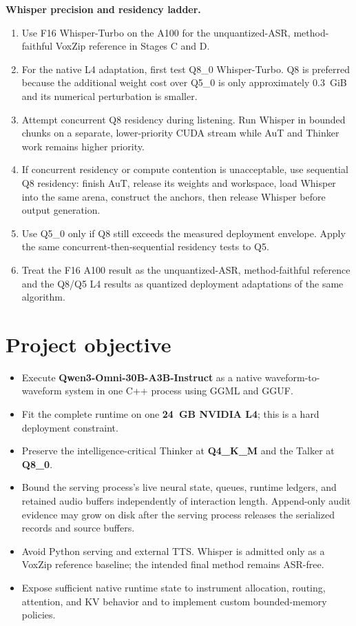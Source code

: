 \documentclass[10pt,letterpaper]{article}
\begin{document}
\noindent\textbf{Whisper precision and residency ladder.}
\begin{enumerate}
    \item Use F16 Whisper-Turbo on the A100 for the unquantized-ASR, method-faithful VoxZip reference in Stages C and D.
    \item For the native L4 adaptation, first test Q8\_0 Whisper-Turbo. Q8 is preferred because the additional weight cost over Q5\_0 is only approximately 0.3~GiB and its numerical perturbation is smaller.
    \item Attempt concurrent Q8 residency during listening. Run Whisper in bounded chunks on a separate, lower-priority CUDA stream while AuT and Thinker work remains higher priority.
    \item If concurrent residency or compute contention is unacceptable, use sequential Q8 residency: finish AuT, release its weights and workspace, load Whisper into the same arena, construct the anchors, then release Whisper before output generation.
    \item Use Q5\_0 only if Q8 still exceeds the measured deployment envelope. Apply the same concurrent-then-sequential residency tests to Q5.
    \item Treat the F16 A100 result as the unquantized-ASR, method-faithful reference and the Q8/Q5 L4 results as quantized deployment adaptations of the same algorithm.
\end{enumerate}

\section*{Project objective}
\begin{itemize}
    \item Execute \textbf{Qwen3-Omni-30B-A3B-Instruct} as a native waveform-to-waveform system in one C++ process using GGML and GGUF.
    \item Fit the complete runtime on one \textbf{24~GB NVIDIA L4}; this is a hard deployment constraint.
    \item Preserve the intelligence-critical Thinker at \textbf{Q4\_K\_M} and the Talker at \textbf{Q8\_0}.
    \item Bound the serving process's live neural state, queues, runtime ledgers, and retained audio buffers independently of interaction length. Append-only audit evidence may grow on disk after the serving process releases the serialized records and source buffers.
    \item Avoid Python serving and external TTS. Whisper is admitted only as a VoxZip reference baseline; the intended final method remains ASR-free.
    \item Expose sufficient native runtime state to instrument allocation, routing, attention, and KV behavior and to implement custom bounded-memory policies.
\end{itemize}
\end{document}
